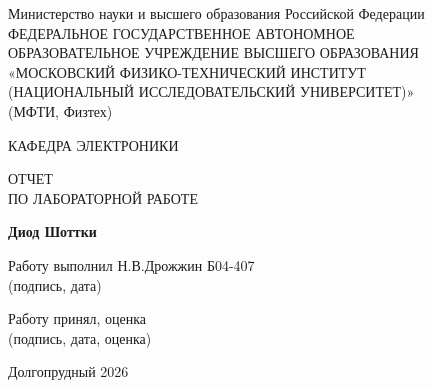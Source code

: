 \documentclass[12pt]{article}
\begin{document}
\begin{center}

\large
Министерство науки и высшего образования Российской Федерации \\
\large
ФЕДЕРАЛЬНОЕ ГОСУДАРСТВЕННОЕ АВТОНОМНОЕ \\
ОБРАЗОВАТЕЛЬНОЕ УЧРЕЖДЕНИЕ ВЫСШЕГО ОБРАЗОВАНИЯ \\
\large
«МОСКОВСКИЙ ФИЗИКО-ТЕХНИЧЕСКИЙ ИНСТИТУТ \\
(НАЦИОНАЛЬНЫЙ ИССЛЕДОВАТЕЛЬСКИЙ УНИВЕРСИТЕТ)» \\
(МФТИ, Физтех)

\vspace{4cm}

\large
КАФЕДРА ЭЛЕКТРОНИКИ

\vspace{0.7cm}

\Large
ОТЧЕТ \\
ПО ЛАБОРАТОРНОЙ РАБОТЕ

\vspace{0.7cm}

\large
\textbf{Диод Шоттки}

\vfill

\noindent
Работу выполнил \hfill \underline{\hspace{6cm}} Н.В.Дрожжин Б04-407 \\
\hfill \small{(подпись, дата)}\par

\vspace{3cm}

\noindent
Работу принял, оценка \hfill \underline{\hspace{6cm}} \\
\hfill \small{(подпись, дата, оценка)}

\vfill

Долгопрудный 2026

\end{center}



\thispagestyle{empty}
\end{document}
